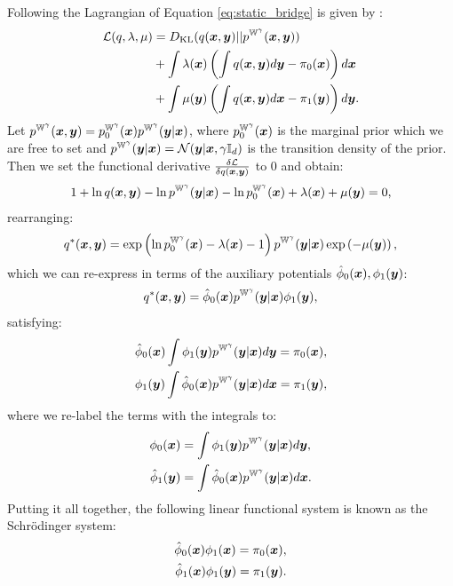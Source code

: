 \documentclass[a4paper,12pt,twoside,openright]{report}
\theoremstyle{definition}
\begin{document}
Following \cite{pavon2018data} the Lagrangian of Equation \ref{eq:static_bridge} is given by :
\begin{align}\label{eq:schro_lagrangian}
    {\mathcal{L}}(q, \lambda,  \mu) &=  D_{\mathrm{KL}} (q({\bm{x}},{\bm{y}})  || p^{\mathbb{W}^{\gamma}}({\bm{x}},{\bm{y}}))  \nonumber\\
    &+ \int \lambda({\bm{x}})\left( \int q({\bm{x}},{\bm{y}})d{\bm{y}} -\pi_0({\bm{x}})\right)d{\bm{x}} \nonumber \\
    &+ \int \mu({\bm{y}}) \left(\int q({\bm{x}},{\bm{y}}) d{\bm{x}} - \pi_1({\bm{y}})\right) d{\bm{y}}.
\end{align}
Let $p^{\mathbb{W}^{\gamma}}({\bm{x}},{\bm{y}}) = p^{\mathbb{W}^{\gamma}}_0({\bm{x}})p^{\mathbb{W}^{\gamma}}({\bm{y}}|{\bm{x}})$, where $p^{\mathbb{W}^{\gamma}}_0({\bm{x}})$ is the marginal prior which we are free to set and $p^{\mathbb{W}^{\gamma}}({\bm{y}}|{\bm{x}})={\mathcal{N}}({\bm{y}} | {\bm{x}}, \gamma{\mathbb{I}_d})$ is the transition density of the prior. Then we set the functional derivative $\frac{\delta {\mathcal{L}}}{\delta q({\bm{x}}, {\bm{y}})}$ to 0 and obtain:
\begin{align*}
    1 + \ln q({\bm{x}}, {\bm{y}})  - \ln p^{\mathbb{W}^{\gamma}}({\bm{y}}|{\bm{x}})
    - \ln p^{\mathbb{W}^{\gamma}}_0({\bm{x}})+ \lambda({\bm{x}})
+ \mu({\bm{y}}) = 0, \nonumber
\end{align*}
rearranging:
\begin{align*}
{q^{*}({\bm{x}}, {\bm{y}}) }  = \exp\left(  \ln p^{\mathbb{W}^{\gamma}}_0({\bm{x}}) -\lambda({\bm{x}}) -1\right)p^{\mathbb{W}^{\gamma}}({\bm{y}}|{\bm{x}})\exp\left(- \mu({\bm{y}})\right) ,\nonumber
\end{align*}
which we can re-express in terms of the auxiliary potentials ${\hat{\phi}}_0({\bm{x}}), \phi_1({\bm{y}})$:
\begin{align*}
{q^{*}({\bm{x}}, {\bm{y}}) }  = {\hat{\phi}}_0({\bm{x}})p^{\mathbb{W}^{\gamma}}({\bm{y}}|{\bm{x}})\phi_1({\bm{y}}), \nonumber
\end{align*}
satisfying:
\begin{align}
    {\hat{\phi}}_0({\bm{x}}) \int \phi_1({\bm{y}}) p^{\mathbb{W}^{\gamma}}({\bm{y}}|{\bm{x}}) d{\bm{y}} = \pi_0({\bm{x}}) , \nonumber\\ 
    \phi_1({\bm{y}}) \int {\hat{\phi}}_0({\bm{x}}) p^{\mathbb{W}^{\gamma}}({\bm{y}}|{\bm{x}}) d{\bm{x}} = \pi_1({\bm{y}}), \nonumber
\end{align}
where we re-label the terms with the integrals to:
\begin{align} \label{eq:sysint}
    \phi_0({\bm{x}}) &= \int \phi_1({\bm{y}}) p^{\mathbb{W}^{\gamma}}({\bm{y}}|{\bm{x}}) d{\bm{y}}, \nonumber\\ 
    {\hat{\phi}}_1({\bm{y}}) &= \int {\hat{\phi}}_0({\bm{x}}) p^{\mathbb{W}^{\gamma}}({\bm{y}}|{\bm{x}}) d{\bm{x}}. \nonumber
\end{align}
Putting it all together, the following linear functional system is known as the Schrödinger system:
\begin{align}
    {\hat{\phi}}_0({\bm{x}}) \phi_1({\bm{x}})  = \pi_0({\bm{x}}),  \nonumber \\ 
    {\hat{\phi}}_1({\bm{x}}) \phi_1({\bm{y}})  = \pi_1({\bm{y}}).
\end{align}
\end{document}
